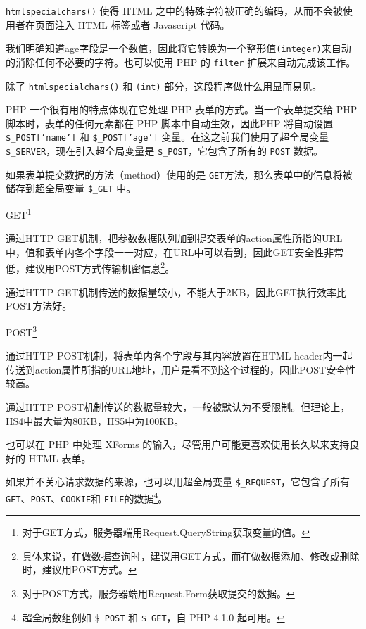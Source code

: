 \texttt{htmlspecialchars()} 使得 HTML 之中的特殊字符被正确的编码，从而不会被使用者在页面注入 HTML 标签或者 Javascript 代码。



我们明确知道age字段是一个数值，因此将它转换为一个整形值\texttt{(integer)}来自动的消除任何不必要的字符。也可以使用 PHP 的 \texttt{filter} 扩展来自动完成该工作。

除了 \texttt{htmlspecialchars()} 和 \texttt{(int)} 部分，这段程序做什么用显而易见。

PHP 一个很有用的特点体现在它处理 PHP 表单的方式。当一个表单提交给 PHP 脚本时，表单的任何元素都在 PHP 脚本中自动生效，因此PHP 将自动设置 \texttt{\$\_POST['name']} 和 \texttt{\$\_POST['age']} 变量。在这之前我们使用了超全局变量 \texttt{\$\_SERVER}，现在引入超全局变量是 \texttt{\$\_POST}，它包含了所有的 \texttt{POST} 数据。

如果表单提交数据的方法（method）使用的是 \texttt{GET}方法，那么表单中的信息将被储存到超全局变量 \texttt{\$\_GET} 中。

\begin{compactitem}
\item GET\footnote{对于GET方式，服务器端用Request.QueryString获取变量的值。}

通过HTTP GET机制，把参数数据队列加到提交表单的action属性所指的URL中，值和表单内各个字段一一对应，在URL中可以看到，因此GET安全性非常低，建议用POST方式传输机密信息\footnote{具体来说，在做数据查询时，建议用GET方式，而在做数据添加、修改或删除时，建议用POST方式。}。

通过HTTP GET机制传送的数据量较小，不能大于2KB，因此GET执行效率比POST方法好。

\item POST\footnote{对于POST方式，服务器端用Request.Form获取提交的数据。}

通过HTTP POST机制，将表单内各个字段与其内容放置在HTML header内一起传送到action属性所指的URL地址，用户是看不到这个过程的，因此POST安全性较高。

通过HTTP POST机制传送的数据量较大，一般被默认为不受限制。但理论上，IIS4中最大量为80KB，IIS5中为100KB。
\end{compactitem}

也可以在 PHP 中处理 XForms 的输入，尽管用户可能更喜欢使用长久以来支持良好的 HTML 表单。


如果并不关心请求数据的来源，也可以用超全局变量 \texttt{\$\_REQUEST}，它包含了所有 \texttt{GET}、\texttt{POST}、\texttt{COOKIE}和 \texttt{FILE}的数据\footnote{超全局数组例如 \texttt{\$\_POST} 和 \texttt{\$\_GET}，自 PHP 4.1.0 起可用。}。

